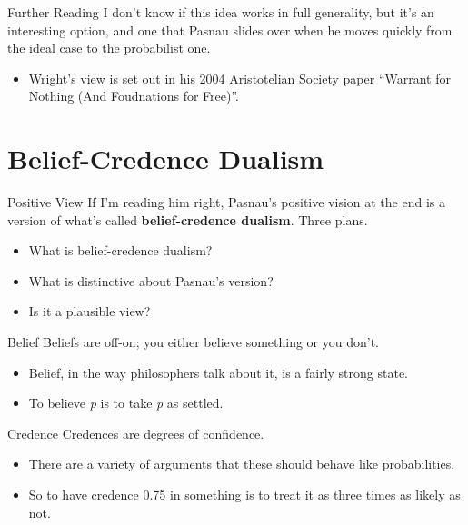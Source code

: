 \documentclass[
  17pt,
  letterpaper,
  ignorenonframetext,
  aspectratio=169,
  handout]{beamer}
\providecommand{\tightlist}{%
  \setlength{\itemsep}{0pt}\setlength{\parskip}{0pt}}\usepackage{longtable,booktabs,array}
\begin{document}
\begin{frame}{Further Reading}
\protect\hypertarget{further-reading}{}
I don't know if this idea works in full generality, but it's an
interesting option, and one that Pasnau slides over when he moves
quickly from the ideal case to the probabilist one.

\begin{itemize}[<+->]
\tightlist
\item
  Wright's view is set out in his 2004 Aristotelian Society paper
  ``Warrant for Nothing (And Foudnations for Free)''.
\end{itemize}
\end{frame}

\hypertarget{belief-credence-dualism}{%
\section{Belief-Credence Dualism}\label{belief-credence-dualism}}

\begin{frame}{Positive View}
\protect\hypertarget{positive-view}{}
If I'm reading him right, Pasnau's positive vision at the end is a
version of what's called \textbf{belief-credence dualism}. Three plans.

\begin{itemize}[<+->]
\tightlist
\item
  What is belief-credence dualism?
\item
  What is distinctive about Pasnau's version?
\item
  Is it a plausible view?
\end{itemize}
\end{frame}

\begin{frame}{Belief}
\protect\hypertarget{belief}{}
Beliefs are off-on; you either believe something or you don't.

\begin{itemize}[<+->]
\tightlist
\item
  Belief, in the way philosophers talk about it, is a fairly strong
  state.
\item
  To believe \emph{p} is to take \emph{p} as settled.
\end{itemize}
\end{frame}

\begin{frame}{Credence}
\protect\hypertarget{credence}{}
Credences are degrees of confidence.

\begin{itemize}[<+->]
\tightlist
\item
  There are a variety of arguments that these should behave like
  probabilities.
\item
  So to have credence 0.75 in something is to treat it as three times as
  likely as not.
\end{itemize}
\end{frame}
\end{document}
